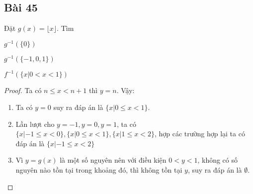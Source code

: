 \subsection*{Bài 45}
Đặt $g(x)=\lfloor x\rfloor$. Tìm
\begin{enumerate}[label=\alph*)]
    \begin{multicols}{2}
        \item $g^{-1}(\{0\})$
        \item $g^{-1}(\{-1,0,1\})$
        \item $f^{-1}(\{x|0<x<1\})$
    \end{multicols}
\end{enumerate}
\begin{proof}
    Ta có $n\leq x<n+1$ thì $y=n$. Vậy:
    \begin{enumerate}[label=\alph*)]
        \item Ta có $y=0$ suy ra đáp án là $\{x|0\leq x<1\}$.
        \item Lần lượt cho $y=-1,y=0,y=1$, ta có $\{x|-1\leq x<0\},\{x|0\leq x<1\},\{x|1\leq x<2\}$, hợp các trường hợp lại ta có đáp án là $\{x|-1\leq x<2\}$
        \item Vì $y=g(x)$ là một số nguyên nên với điều kiện $0<y<1$, không có số nguyên nào tồn tại trong khoảng đó, thì không tồn tại $y$, suy ra đáp án là $\emptyset$.
    \end{enumerate}
\end{proof}
